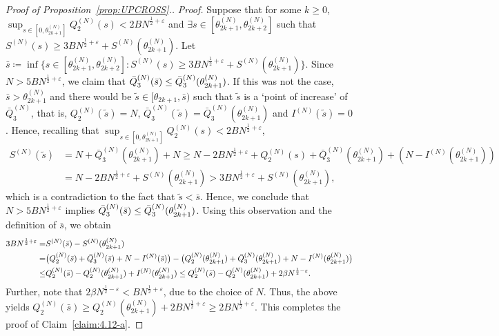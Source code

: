 \documentclass[11pt, reqno]{article}
\numberwithin{equation}{section}
\numberwithin{theorem}{section}
\begin{document}
\begin{proof}[Proof of Proposition~\ref{prop:UPCROSS}.]
\emph{Proof.}
 Suppose that for some $k\geq 0$, $\sup_{s\in[0,\theta^{(N)}_{2k+1}]}Q^{(N)}_2(s)<2BN^{\frac{1}{2}+\varepsilon}$ and $\exists s\in [\theta^{(N)}_{2k+1},\theta^{(N)}_{2k+2}]$ such that $S^{(N)}(s)\geq 3BN^{\frac{1}{2}+\varepsilon}+S^{(N)}(\theta^{(N)}_{2k+1})$.
Let  $\bar{s}\coloneqq \inf\{s\in [\theta^{(N)}_{2k+1},\theta^{(N)}_{2k+2}]:S^{(N)}(s)\geq 3BN^{\frac{1}{2}+\varepsilon}+S^{(N)}(\theta^{(N)}_{2k+1})\}.$
Since $N > 5B N^{\frac{1}{2}+\varepsilon}$, we claim that $\Bar{Q}^{(N)}_3(\bar{s})\leq \bar{Q}^{(N)}_3(\theta^{(N)}_{2k+1})$. If this was not the case, $\bar s > \theta^{(N)}_{2k+1}$ and there would be $\tilde s \in [\theta_{2k+1}, \bar s)$ such that $\tilde s$ is a `point of increase' of $\bar Q_3^{(N)}$, that is, $Q_2^{(N)}(\tilde s) = N$, $\bar Q_3^{(N)}(\tilde s) = \bar Q_3^{(N)}(\theta^{(N)}_{2k+1})$ and $I^{(N)}(\tilde s) = 0$. Hence, recalling that $\sup_{s\in[0,\theta^{(N)}_{2k+1}]}Q^{(N)}_2(s)<2BN^{\frac{1}{2}+\varepsilon}$,
\begin{align*}
S^{(N)}(\tilde s) &= N + \bar Q_3^{(N)}(\theta^{(N)}_{2k+1}) + N \ge N - 2BN^{\frac{1}{2}+\varepsilon} + Q^{(N)}_2(s) + \bar Q_3^{(N)}(\theta^{(N)}_{2k+1}) + (N- I^{(N)}(\theta^{(N)}_{2k+1}))\\
&=N - 2BN^{\frac{1}{2}+\varepsilon} + S^{(N)}(\theta^{(N)}_{2k+1}) > 3BN^{\frac{1}{2}+\varepsilon} + S^{(N)}(\theta^{(N)}_{2k+1}),
\end{align*}
which is a contradiction to the fact that $\tilde s < \bar s$. Hence, we conclude that $N > 5B N^{\frac{1}{2}+\varepsilon}$ implies $\Bar{Q}^{(N)}_3(\bar{s})\leq \bar{Q}^{(N)}_3(\theta^{(N)}_{2k+1})$.
Using this observation and the definition of $\bar s$, we obtain
\begin{align*}
    3BN^{\frac{1}{2}+\varepsilon}=&S^{(N)}(\bar{s})-S^{(N)}(\theta^{(N)}_{2k+1})\\
    =&\big(Q^{(N)}_2(\bar{s})+\Bar{Q}^{(N)}_3(\bar{s})+N-I^{(N)}(\bar{s})\big)-\big(Q^{(N)}_2(\theta^{(N)}_{2k+1})+\Bar{Q}^{(N)}_3(\theta^{(N)}_{2k+1})+N-I^{(N)}(\theta^{(N)}_{2k+1})\big)\\
    \leq & Q_2^{(N)}(\bar{s})-Q_2^{(N)}(\theta^{(N)}_{2k+1})+I^{(N)}(\theta^{(N)}_{2k+1})
    \leq  Q_2^{(N)}(\bar{s})-Q_2^{(N)}(\theta^{(N)}_{2k+1})+2\beta N^{\frac{1}{2}-\varepsilon}.
\end{align*}
Further, note that $2\beta N^{\frac{1}{2}-\varepsilon}<BN^{\frac{1}{2}+\varepsilon}$, due to the choice of $N$. 
Thus, the above yields 
$Q^{(N)}_2(\bar{s})\geq Q^{(N)}_2(\theta^{(N)}_{2k+1})+2BN^{\frac{1}{2}+\varepsilon}\geq 2BN^{\frac{1}{2}+\varepsilon}.$
This completes the proof of Claim~\ref{claim:4.12-a}.


\end{proof}
\end{document}
